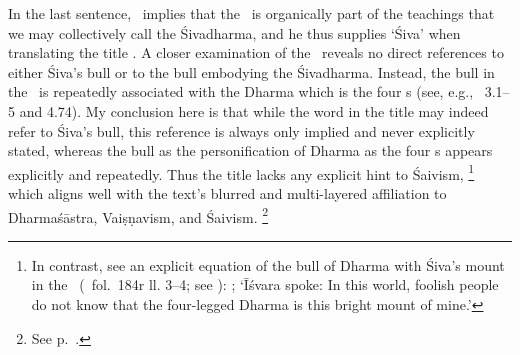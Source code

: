 \noindent
In the last sentence, \Sanderson\ implies that the
\VSS\ is organically part of the teachings that we
may collectively call the Śivadharma, and he
thus supplies `Śiva' when translating the title \Vss.
A closer examination of the \VSS\ 
reveals no direct references to either Śiva's bull or
to the bull embodying the Śivadharma. Instead, the bull
in the \VSS\ is repeatedly associated with the Dharma which
is the four \asrama s (see, e.g., \VSS\ 3.1--5 and 4.74).
My conclusion here is that while the word  in the
title may indeed refer to Śiva's bull, 
this reference is always only implied and never explicitly stated,
whereas the bull as the personification of Dharma as the four
\asrama s appears explicitly and repeatedly. Thus
the title lacks any explicit hint to Śaivism,%
	\footnote{In contrast, see an explicit equation of the bull
	of Dharma with Śiva's mount in the \Uums\
					(\msCa\ fol.~184r ll. 3--4; see
					):
		;
		    `Īśvara spoke: In this world, foolish people do not know that
		    the four-legged Dharma is this bright mount of mine.'}
which aligns well with the text's blurred and multi-layered
affiliation to Dharmaśāstra, Vaiṣṇavism, and Śaivism.%
		 \footnote{See p.~\pageref{structure}.}




